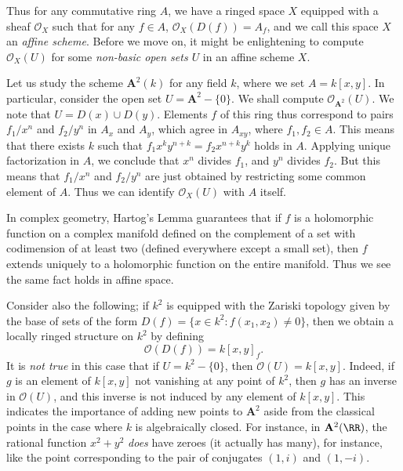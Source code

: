 Thus for any commutative ring $A$, we have a ringed space $X$ equipped with a sheaf $\mathcal{O}_X$ such that for any $f \in A$, $\mathcal{O}_X(D(f)) = A_f$, and we call this space $X$ an \emph{affine scheme}. Before we move on, it might be enlightening to compute $\mathcal{O}_X(U)$ for some \emph{non-basic open sets $U$} in an affine scheme $X$.

\begin{example}
    Let us study the scheme $\mathbf{A}^2(k)$ for any field $k$, where we set $A = k[x,y]$. In particular, consider the open set $U = \mathbf{A}^2 - \{ 0 \}$. We shall compute $\mathcal{O}_{\mathbf{A}^2}(U)$. We note that $U = D(x) \cup D(y)$. Elements $f$ of this ring thus correspond to pairs $f_1/x^n$ and $f_2/y^n$ in $A_x$ and $A_y$, which agree in $A_{xy}$, where $f_1,f_2 \in A$. This means that there exists $k$ such that $f_1x^ky^{n+k} = f_2x^{n+k} y^k$ holds in $A$. Applying unique factorization in $A$, we conclude that $x^n$ divides $f_1$, and $y^n$ divides $f_2$. But this means that $f_1/x^n$ and $f_2/y^n$ are just obtained by restricting some common element of $A$. Thus we can identify $\mathcal{O}_X(U)$ with $A$ itself.

    In complex geometry, Hartog's Lemma guarantees that if $f$ is a holomorphic function on a complex manifold defined on the complement of a set with codimension of at least two (defined everywhere except a small set), then $f$ extends uniquely to a holomorphic function on the entire manifold. Thus we see the same fact holds in affine space.

    Consider also the following; if $k^2$ is equipped with the Zariski topology given by the base of sets of the form $D(f) = \{ x \in k^2: f(x_1,x_2) \neq 0 \}$, then we obtain a locally ringed structure on $k^2$ by defining
    \[ \mathcal{O}(D(f)) = k[x,y]_{f}. \]
    It is \emph{not true} in this case that if $U = k^2 - \{ 0 \}$, then $\mathcal{O}(U) = k[x,y]$. Indeed, if $g$ is an element of $k[x,y]$ not vanishing at any point of $k^2$, then $g$ has an inverse in $\mathcal{O}(U)$, and this inverse is not induced by any element of $k[x,y]$. This indicates the importance of adding new points to $\mathbf{A}^2$ aside from the classical points in the case where $k$ is algebraically closed. For instance, in $\mathbf{A}^2(\RR)$, the rational function $x^2 + y^2$ \emph{does} have zeroes (it actually has many), for instance, like the point corresponding to the pair of conjugates $(1,i)$ and $(1,-i)$.
\end{example}

